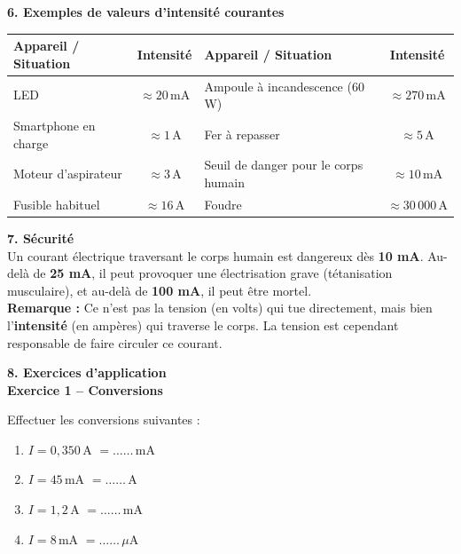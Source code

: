 \documentclass[11pt,a4paper]{article}
\renewcommand{\arraystretch}{2}
\begin{document}

\vspace{3mm}

\textbf{6. Exemples de valeurs d'intensité courantes}

\begin{center}
\renewcommand{\arraystretch}{1.5}
\begin{tabular}{|l|c||l|c|}
\hline
\textbf{Appareil / Situation} & \textbf{Intensité} & \textbf{Appareil / Situation} & \textbf{Intensité} \\
\hline
LED & $\approx 20\,\text{mA}$ & Ampoule à incandescence (60 W) & $\approx 270\,\text{mA}$ \\
\hline
Smartphone en charge & $\approx 1\,\text{A}$ & Fer à repasser & $\approx 5\,\text{A}$ \\
\hline
Moteur d'aspirateur & $\approx 3\,\text{A}$ & Seuil de danger pour le corps humain & $\approx 10\,\text{mA}$ \\
\hline
Fusible habituel & $\approx 16\,\text{A}$ & Foudre & $\approx 30\,000\,\text{A}$ \\
\hline
\end{tabular}
\end{center}

\vspace{3mm}

\textbf{7. Sécurité} \\

Un courant électrique traversant le corps humain est dangereux dès \textbf{10 mA}. Au-delà de \textbf{25 mA}, il peut provoquer une électrisation grave (tétanisation musculaire), et au-delà de \textbf{100 mA}, il peut être mortel. \\

\textbf{Remarque : } Ce n'est pas la tension (en volts) qui tue directement, mais bien l'\textbf{intensité} (en ampères) qui traverse le corps. La tension est cependant responsable de faire circuler ce courant. \\

\vspace{3mm}

\textbf{8. Exercices d'application} \\

\textbf{Exercice 1 -- Conversions}

Effectuer les conversions suivantes :
\begin{enumerate}
    \item $I = 0{,}350\,\text{A}$ \quad $= \ldots\ldots\,\text{mA}$
    \item $I = 45\,\text{mA}$ \quad $= \ldots\ldots\,\text{A}$
    \item $I = 1{,}2\,\text{A}$ \quad $= \ldots\ldots\,\text{mA}$
    \item $I = 8\,\text{mA}$ \quad $= \ldots\ldots\,\mu\text{A}$
\end{enumerate}
\end{document}
